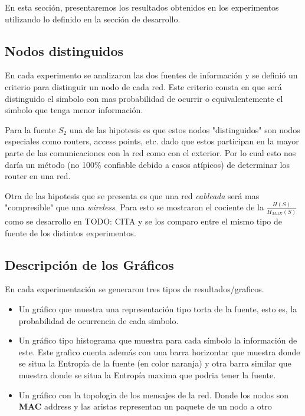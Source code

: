 En esta secci\'on, presentaremos los resultados obtenidos en los experimentos
utilizando lo definido en la secci\'on de desarrollo.

\subsection{Nodos distinguidos}

En cada experimento se analizaron las dos fuentes de información y se definió
un criterio para distinguir un nodo de cada red. Este criterio consta en que
será distinguido el simbolo con mas probabilidad de ocurrir o equivalentemente
el simbolo que tenga menor información.

Para la fuente $S_2$ una de las hipotesis es que estos nodos "distinguidos" son
nodos especiales como routers, access points, etc. dado que estos participan
en la mayor parte de las comunicaciones con la red como con el exterior.
Por lo cual esto nos daría un método (no 100\% confiable debido a casos
atípicos) de determinar los router en una red.

Otra de las hipotesis que se presenta es que una red \textit{cableada} será
mas "compresible" que una \textit{wireless}. Para esto se mostraron el
cociente de la $\frac{H(S)}{H_{MAX}(S)}$ como se desarrollo en TODO: CITA
y se los comparo entre el mismo tipo de fuente de los distintos experimentos.

\subsection{Descripción de los Gráficos}

En cada experimentación se generaron tres tipos de resultados/graficos.

\begin{itemize}
	\item Un gráfico que muestra una representación tipo torta de la fuente, esto es, la probabilidad de ocurrencia de cada simbolo.
	\item Un gráfico tipo histograma que muestra para cada símbolo la información de este. Este grafico cuenta además con una barra
	horizontar que muestra donde se situa la Entropía de la fuente (en color naranja) y otra barra similar que muestra donde
	se situa la Entropía maxima que podria tener la fuente.
	\item Un gráfico con la topologia de los mensajes de la red. Donde los nodos son \textbf{MAC} address y las
	aristas representan un paquete de un nodo a otro
\end{itemize}

